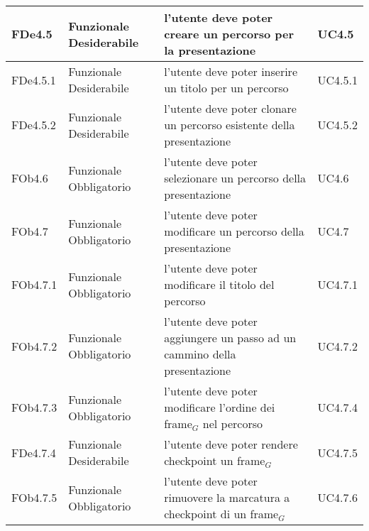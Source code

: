 \begin{longtable}{|l|p{2.5cm}|p{5cm}|p{3.5cm}|}
FDe4.5 & Funzionale \linebreak Desiderabile & l'utente deve poter creare un percorso per la presentazione & UC4.5 \linebreak  \\
\hline
FDe4.5.1 & Funzionale \linebreak Desiderabile & l'utente deve poter inserire un titolo per un percorso & UC4.5.1 \linebreak  \\
\hline
FDe4.5.2 & Funzionale \linebreak Desiderabile & l'utente deve poter clonare un percorso esistente della presentazione & UC4.5.2 \linebreak  \\
\hline
FOb4.6 & Funzionale \linebreak Obbligatorio & l'utente deve poter selezionare un percorso della presentazione & UC4.6 \linebreak  \\
\hline
FOb4.7 & Funzionale \linebreak Obbligatorio & l'utente deve poter modificare un percorso della presentazione & UC4.7 \linebreak  \\
\hline
FOb4.7.1 & Funzionale \linebreak Obbligatorio & l'utente deve poter modificare il titolo del percorso & UC4.7.1 \linebreak  \\
\hline
FOb4.7.2 & Funzionale \linebreak Obbligatorio & l'utente deve poter aggiungere un passo ad un cammino della presentazione & UC4.7.2 \linebreak  \\
\hline
FOb4.7.3 & Funzionale \linebreak Obbligatorio & l'utente deve poter modificare l'ordine dei frame$_G$ nel percorso & UC4.7.4 \linebreak  \\
\hline
FDe4.7.4 & Funzionale \linebreak Desiderabile & l'utente deve poter rendere checkpoint un frame$_G$ & UC4.7.5 \linebreak  \\
\hline
FOb4.7.5 & Funzionale \linebreak Obbligatorio & l'utente deve poter rimuovere la marcatura a checkpoint di un frame$_G$ & UC4.7.6 \linebreak  \\

\end{longtable}
